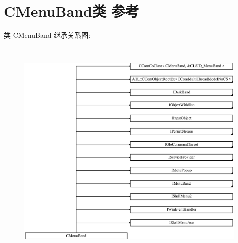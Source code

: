 \hypertarget{class_c_menu_band}{}\section{C\+Menu\+Band类 参考}
\label{class_c_menu_band}
类 C\+Menu\+Band 继承关系图\+:\begin{figure}[H]
\begin{center}
\leavevmode
\includegraphics[height=11.136364cm]{class_c_menu_band}
\end{center}
\end{figure}
